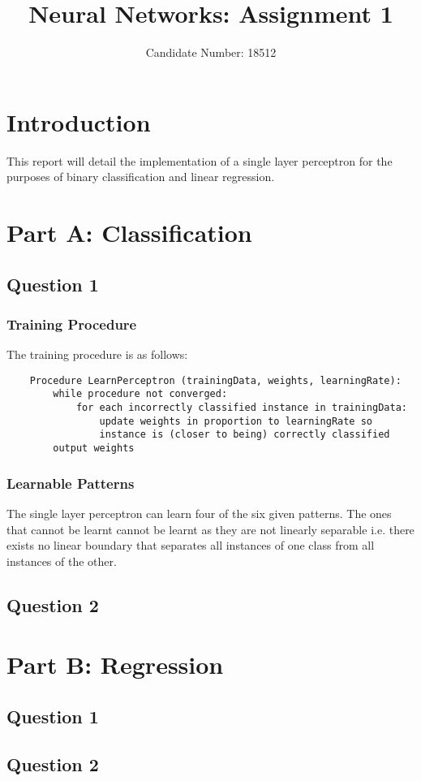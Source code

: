 \documentclass{article}
\title{Neural Networks: Assignment 1}
\author{Candidate Number: 18512}
\begin{document}
\maketitle

\section*{Introduction}
This report will detail the implementation of a single layer perceptron for the purposes of binary classification and linear regression.

\section*{Part A: Classification}
\subsection*{Question 1}
\subsubsection*{Training Procedure}
The training procedure is as follows:

\begin{verbatim}
    Procedure LearnPerceptron (trainingData, weights, learningRate):
        while procedure not converged:
            for each incorrectly classified instance in trainingData:
                update weights in proportion to learningRate so
                instance is (closer to being) correctly classified
        output weights
\end{verbatim}

\subsubsection*{Learnable Patterns}
The single layer perceptron can learn four of the six given patterns. The ones that cannot be learnt cannot be learnt as they are not linearly separable i.e. there exists no linear boundary that separates all instances of one class from all instances of the other.

\subsection*{Question 2}

\section*{Part B: Regression}
\subsection*{Question 1}

\subsection*{Question 2}
\end{document}
